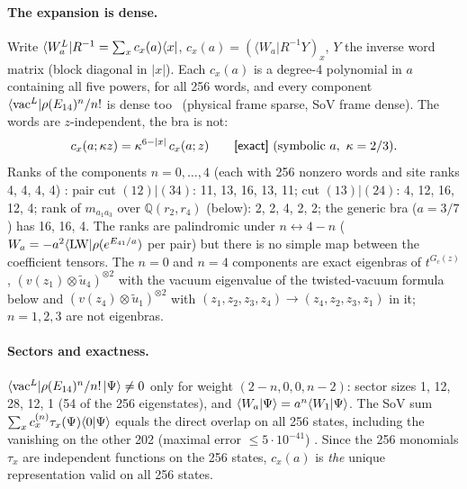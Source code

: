 \paragraph{The expansion is dense.} Write $\langle W_a^L|R^{-1}=\sum_xc_x(a)\langle x|$, $c_x(a)=(\langle W_a|R^{-1}Y)_x$, $Y$ the inverse word matrix (block diagonal in $|x|$). Each $c_x(a)$ is a degree-4 polynomial in $a$ containing all
five powers, for all 256 words, and every component $\langle\mathrm{vac}^L|\rho(E_{14})^n/n!$ is dense too \ex\ (physical frame sparse, SoV frame dense). The words are $z$-independent, the bra is not:
\begin{equation}
 c_x(a;\kappa z)=\kappa^{6-|x|}\,c_x(a;z)\qquad\ex\ (\text{symbolic }a,\ \kappa=2/3).
\end{equation}
Ranks of the components $n=0,\dots,4$ (each with 256 nonzero words and site ranks 4, 4, 4, 4) \ex: pair cut $(12)|(34)$: 11, 13, 16, 13, 11; cut $(13)|(24)$: 4, 12, 16, 12, 4; rank of $m_{a_1a_3}$ over
$\mathbb Q(r_2,r_4)$ (below): 2, 2, 4, 2, 2; the generic bra ($a=3/7$) has 16, 16, 4. The ranks are palindromic under $n\leftrightarrow4-n$ ($W_a=-a^2\langle{\rm LW}|\rho(e^{E_{41}/a})$ per pair) but there is no simple map between
the coefficient tensors. The $n=0$ and $n=4$ components are exact eigenbras of $t^{G_c(z)}$ \ex, $(v(z_1)\otimes\tilde u_4)^{\otimes2}$ with the vacuum eigenvalue of the twisted-vacuum formula below and
$(v(z_4)\otimes\tilde u_1)^{\otimes2}$ with $(z_1,z_2,z_3,z_4)\to(z_4,z_2,z_3,z_1)$ in it; $n=1,2,3$ are not eigenbras.

\paragraph{Sectors and exactness.} $\langle\mathrm{vac}^L|\rho(E_{14})^n/n!\,|\Psi\rangle\ne0$ only for weight $(2-n,0,0,n-2)$: sector sizes 1, 12, 28, 12, 1 (54 of the 256 eigenstates), and $\langle W_a|\Psi\rangle=a^n\langle W_1|\Psi\rangle$. The SoV sum
$\sum_xc^{(n)}_x\tau_x(\Psi)\langle0|\Psi\rangle$ equals the direct overlap on all 256 states, including the vanishing on the other 202 (maximal error $\le5\cdot10^{-41}$) \hp. Since the 256 monomials $\tau_x$
are independent functions on the 256 states, $c_x(a)$ is \emph{the} unique representation valid on all 256 states.

